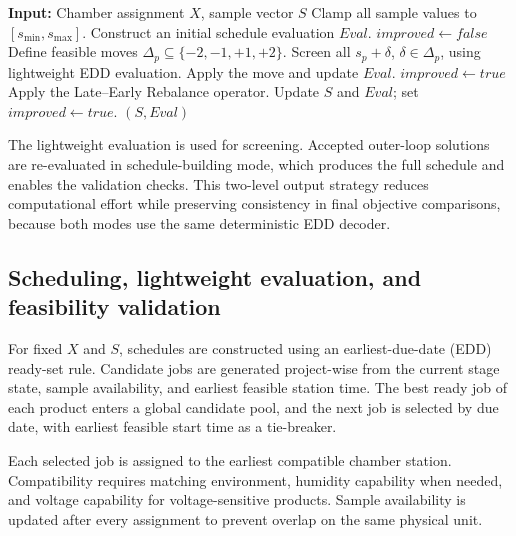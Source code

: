 \documentclass[11pt]{article}
\begin{document}
\begin{algorithm}[H]
\caption{Sample-size local search}
\label{alg:sample_ls_short}
\begin{algorithmic}[1]
\State \textbf{Input:} Chamber assignment \(X\), sample vector \(S\)
\State Clamp all sample values to \([s_{\min},s_{\max}]\).
\State Construct an initial schedule evaluation \(Eval\).
\Repeat
    \State \(improved\leftarrow false\)
        \State Define feasible moves \(\Delta_p\subseteq\{-2,-1,+1,+2\}\).
        \State Screen all \(s_p+\delta\), \(\delta\in\Delta_p\), using lightweight EDD evaluation.
            \State Apply the move and update \(Eval\).
            \State \(improved\leftarrow true\)
        \EndIf
    \EndFor
    \State Apply the Late--Early Rebalance operator.
        \State Update \(S\) and \(Eval\); set \(improved\leftarrow true\).
    \EndIf
{}
\State \Return \((S,Eval)\)
\end{algorithmic}
\end{algorithm}

The lightweight evaluation is used for screening. Accepted outer-loop solutions are re-evaluated in schedule-building mode, which produces the full schedule and enables the validation checks. This two-level output strategy reduces computational effort while preserving consistency in final objective comparisons, because both modes use the same deterministic EDD decoder.

\subsection{Scheduling, lightweight evaluation, and feasibility validation}
\label{subsec:scheduling}

For fixed \(X\) and \(S\), schedules are constructed using an earliest-due-date (EDD) ready-set rule. Candidate jobs are generated project-wise from the current stage state, sample availability, and earliest feasible station time. The best ready job of each product enters a global candidate pool, and the next job is selected by due date, with earliest feasible start time as a tie-breaker.

Each selected job is assigned to the earliest compatible chamber station. Compatibility requires matching environment, humidity capability when needed, and voltage capability for voltage-sensitive products. Sample availability is updated after every assignment to prevent overlap on the same physical unit.
\end{document}
